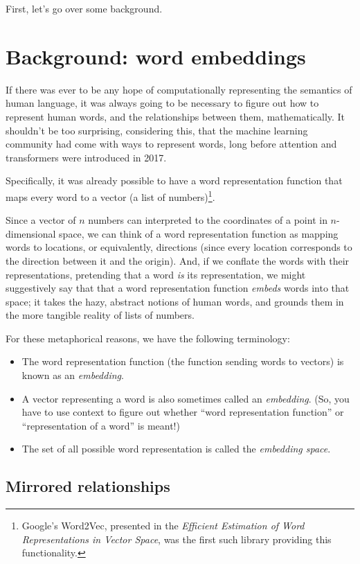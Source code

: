 \documentclass{article}
\begin{document}
First, let's go over some background.

\section*{Background: word embeddings}

If there was ever to be any hope of computationally representing the semantics of human language, it was always going to be necessary to figure out how to represent human words, and the relationships between them, mathematically. It shouldn't be too surprising, considering this, that the machine learning community had come with ways to represent words, long before attention and transformers were introduced in 2017.

Specifically, it was already possible to have a word representation function that maps every word to a vector (a list of numbers)\footnote{Google's Word2Vec, presented in the \textit{Efficient Estimation of Word Representations in Vector Space}, was the first such library providing this functionality.}.

Since a vector of $n$ numbers can interpreted to the coordinates of a point in $n$-dimensional space, we can think of a word representation function as mapping words to locations, or equivalently, directions (since every location corresponds to the direction between it and the origin). And, if we conflate the words with their representations, pretending that a word \textit{is} its representation, we might suggestively say that that a word representation function \textit{embeds} words into that space; it takes the hazy, abstract notions of human words, and grounds them in the more tangible reality of lists of numbers.

For these metaphorical reasons, we have the following terminology:

\begin{itemize}
	\item The word representation function (the function sending words to vectors) is known as an \textit{embedding}.
	\item A vector representing a word is also sometimes called an \textit{embedding}. (So, you have to use context to figure out whether ``word representation function'' or ``representation of a word'' is meant!)
	\item The set of all possible word representation is called the \textit{embedding space}.
\end{itemize}

\subsection*{Mirrored relationships}
\end{document}
